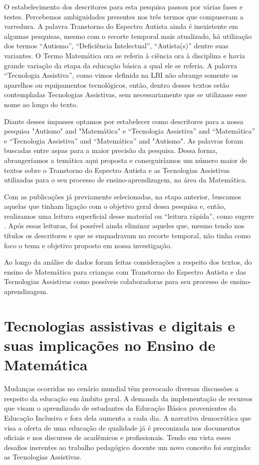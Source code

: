 \documentclass[portuguese]{textolivre}
\begin{document}
O estabelecimento dos descritores para esta pesquisa passou por várias
fases e testes. Percebemos ambiguidades presentes nos três termos que
compuseram a varredura. A palavra Transtorno do Espectro Autista ainda é
inexistente em algumas pesquisas, mesmo com o recorte temporal mais
atualizado, há utilização dos termos ``Autismo'', ``Deficiência
Intelectual'', ``Autista(s)'' dentre suas variantes. O Termo Matemática
ora se referia à ciência ora à disciplina e havia grande variação da
etapa da educação básica a qual ele se referia. A palavra ``Tecnologia
Assistiva'', como vimos definida na LBI \cite{brasil2015} não abrange
somente os aparelhos ou equipamentos tecnológicos, então, dentro desses
textos estão contempladas Tecnologias Assistivas, sem necessariamente
que se utilizasse esse nome ao longo do texto.

Diante desses impasses optamos por estabelecer como descritores para a
nossa pesquisa "Autismo" and "Matemática" e ``Tecnologia Assistiva'' and
``Matemática'' e ``Tecnologia Assistiva'' and ``Matemática'' and
"Autismo". As palavras foram buscadas entre aspas para a maior precisão
da pesquisa. Dessa forma, abrangeríamos a temática aqui proposta e
conseguiríamos um número maior de textos sobre o Transtorno do Espectro
Autista e as Tecnologias Assistivas utilizadas para o seu processo de
ensino-aprendizagem, na área da Matemática.

Com as publicações já previamente selecionadas, na etapa anterior,
buscamos aquelas que tinham ligação com o objetivo geral dessa pesquisa
e, então, realizamos uma leitura superficial desse material ou ``leitura
rápida'', como sugere \textcite{gil2008}. Após essas leituras, foi possível
ainda eliminar aqueles que, mesmo tendo nos títulos os descritores e que
se enquadravam no recorte temporal, não tinha como foco o tema e
objetivo proposto em nossa investigação.

Ao longo da análise de dados foram feitas considerações a respeito dos
textos, do ensino de Matemática para crianças com Transtorno do Espectro
Autista e das Tecnologias Assistivas como possíveis colaboradoras para
seu processo de ensino-aprendizagem.




\section{Tecnologias assistivas e digitais e suas implicações no
Ensino de Matemática}

Mudanças ocorridas no cenário mundial têm provocado diversas discussões
a respeito da educação em âmbito geral. A demanda da implementação de
recursos que visam o aprendizado de estudantes da Educação Básica
provenientes da Educação Inclusiva e fora dela aumenta a cada dia. A
narrativa democrática que visa a oferta de uma educação de qualidade já
é preconizada nos documentos oficiais e nos discursos de acadêmicos e
profissionais. Tendo em vista esses desafios inerentes ao trabalho
pedagógico docente um novo conceito foi surgindo: as Tecnologias
Assistivas.
\end{document}
